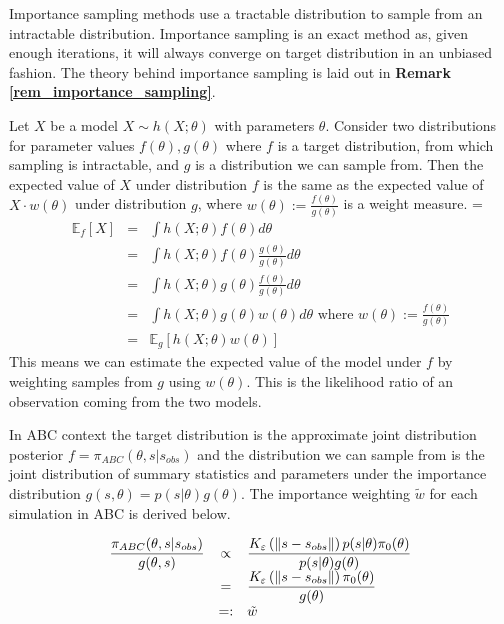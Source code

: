 \documentclass[11pt,a4paper]{article}
\newcommand*{\expect}{\mathbb{E}}
\theoremstyle{break}
\begin{document}

  \par Importance sampling methods use a tractable distribution to sample from an intractable distribution. Importance sampling is an exact method as, given enough iterations, it will always converge on target distribution in an unbiased fashion. The theory behind importance sampling is laid out in \textbf{Remark \ref{rem_importance_sampling}}.

  \begin{box_remark}\label{rem_importance_sampling}
    Let $X$ be a model $X\sim h(X;\theta)$ with parameters $\theta$. Consider two distributions for parameter values $f(\theta),g(\theta)$ where $f$ is a target distribution, from which sampling is intractable, and $g$ is a distribution we can sample from. Then the expected value of $X$ under distribution $f$ is the same as the expected value of $X\cdot w(\theta)$ under distribution $g$, where $w(\theta):=\frac{f(\theta)}{g(\theta)}$ is a weight measure.
    \everymath={\displaystyle}
    \[\begin{array}{rcl}
      \expect_f[X]&=&\int h(X;\theta)f(\theta)d\theta\\
      &=&\int h(X;\theta)f(\theta)\frac{g(\theta)}{g(\theta)}d\theta\\
      &=&\int h(X;\theta)g(\theta)\frac{f(\theta)}{g(\theta)}d\theta\\
      &=&\int h(X;\theta)g(\theta)w(\theta)d\theta\text{ where }w(\theta):=\frac{f(\theta)}{g(\theta)}\\
      &=&\expect_g[h(X;\theta)w(\theta)]
    \end{array}\]
    This means we can estimate the expected value of the model under $f$ by weighting samples from $g$ using $w(\theta)$. This is the likelihood ratio of an observation coming from the two models.
  \end{box_remark}

  \par In ABC context the target distribution is the approximate joint distribution posterior $f=\pi_{ABC}(\theta,s|s_{obs})$ and the distribution we can sample from is the joint distribution of summary statistics and parameters under the importance distribution $g(s,\theta)=p(s|\theta)g(\theta)$. The importance weighting $\tilde{w}$ for each simulation in ABC is derived below.

  \[\everymath={\displaystyle}\begin{array}{rcl}
    \frac{\pi_{ABC}(\theta,s|s_{obs})}{g(\theta,s)}&\propto&\frac{K_\varepsilon\left(\|s-s_{obs}\|\right)p(s|\theta)\pi_0(\theta)}{p(s|\theta)g(\theta)}\\
    &=&\frac{K_\varepsilon\left(\|s-s_{obs}\|\right)\pi_0(\theta)}{g(\theta)}\\
    &=:&\tilde{w}
  \end{array}\]
\end{document}
